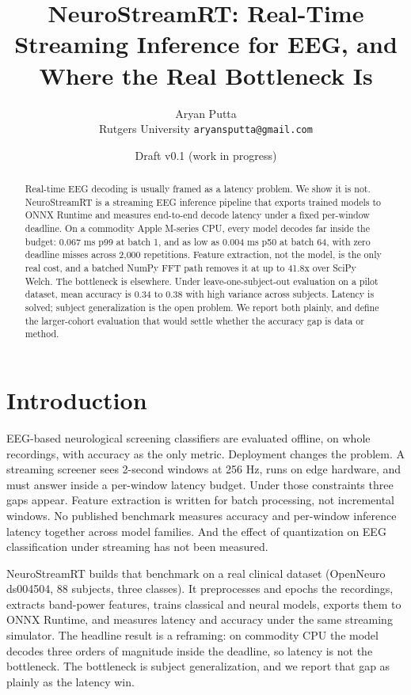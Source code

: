 \documentclass[10pt,twocolumn]{article}
\title{\vspace{-3.5em}\textbf{NeuroStreamRT: Real-Time Streaming Inference for EEG, and Where the Real Bottleneck Is}}
\author{Aryan Putta\\ \small Rutgers University \quad \texttt{aryansputta@gmail.com}}
\date{\small Draft v0.1 (work in progress)}
\begin{document}
\maketitle

\begin{abstract}
\noindent
Real-time EEG decoding is usually framed as a latency problem. We show it is not.
NeuroStreamRT is a streaming EEG inference pipeline that exports trained models to
ONNX Runtime and measures end-to-end decode latency under a fixed per-window
deadline. On a commodity Apple M-series CPU, every model decodes far inside the
budget: 0.067 ms p99 at batch 1, and as low as 0.004 ms p50 at batch 64, with
zero deadline misses across 2{,}000 repetitions. Feature extraction, not the
model, is the only real cost, and a batched NumPy FFT path removes it at up to
41.8x over SciPy Welch. The bottleneck is elsewhere. Under leave-one-subject-out
evaluation on a pilot dataset, mean accuracy is 0.34 to 0.38 with high variance
across subjects. Latency is solved; subject generalization is the open problem.
We report both plainly, and define the larger-cohort evaluation that would settle
whether the accuracy gap is data or method.
\end{abstract}

\section{Introduction}
EEG-based neurological screening classifiers are evaluated offline, on whole
recordings, with accuracy as the only metric. Deployment changes the problem. A
streaming screener sees 2-second windows at 256 Hz, runs on edge hardware, and
must answer inside a per-window latency budget. Under those constraints three
gaps appear. Feature extraction is written for batch processing, not incremental
windows. No published benchmark measures accuracy and per-window inference
latency together across model families. And the effect of quantization on EEG
classification under streaming has not been measured.

NeuroStreamRT builds that benchmark on a real clinical dataset (OpenNeuro
ds004504, 88 subjects, three classes). It preprocesses and epochs the recordings,
extracts band-power features, trains classical and neural models, exports them to
ONNX Runtime, and measures latency and accuracy under the same streaming
simulator. The headline result is a reframing: on commodity CPU the model decodes
three orders of magnitude inside the deadline, so latency is not the bottleneck.
The bottleneck is subject generalization, and we report that gap as plainly as
the latency win.
\end{document}

